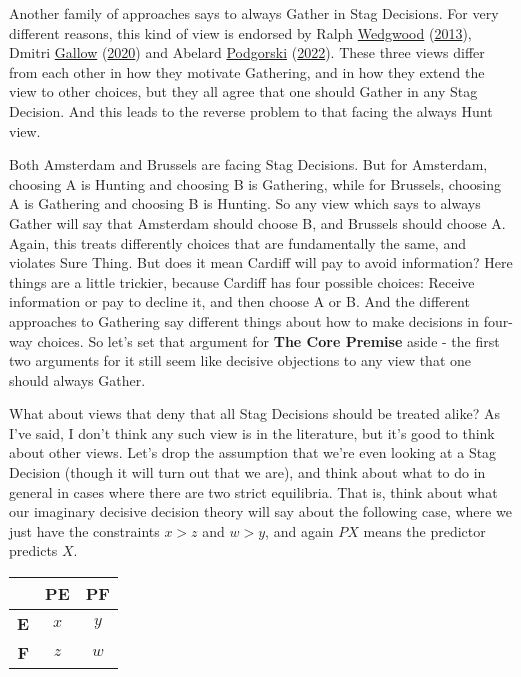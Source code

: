 \documentclass[
  12pt,
]{article}
\begin{document}
Another family of approaches says to always Gather in Stag Decisions.
For very different reasons, this kind of view is endorsed by Ralph
\protect\hyperlink{ref-Wedgwood2013}{Wedgwood}
(\protect\hyperlink{ref-Wedgwood2013}{2013}), Dmitri
\protect\hyperlink{ref-Gallow2020}{Gallow}
(\protect\hyperlink{ref-Gallow2020}{2020}) and Abelard
\protect\hyperlink{ref-Podgorski2022}{Podgorski}
(\protect\hyperlink{ref-Podgorski2022}{2022}). These three views differ
from each other in how they motivate Gathering, and in how they extend
the view to other choices, but they all agree that one should Gather in
any Stag Decision. And this leads to the reverse problem to that facing
the always Hunt view.

Both Amsterdam and Brussels are facing Stag Decisions. But for
Amsterdam, choosing A is Hunting and choosing B is Gathering, while for
Brussels, choosing A is Gathering and choosing B is Hunting. So any view
which says to always Gather will say that Amsterdam should choose B, and
Brussels should choose A. Again, this treats differently choices that
are fundamentally the same, and violates Sure Thing. But does it mean
Cardiff will pay to avoid information? Here things are a little
trickier, because Cardiff has four possible choices: Receive information
or pay to decline it, and then choose A or B. And the different
approaches to Gathering say different things about how to make decisions
in four-way choices. So let's set that argument for \textbf{The Core
Premise} aside - the first two arguments for it still seem like decisive
objections to any view that one should always Gather.

What about views that deny that all Stag Decisions should be treated
alike? As I've said, I don't think any such view is in the literature,
but it's good to think about other views. Let's drop the assumption that
we're even looking at a Stag Decision (though it will turn out that we
are), and think about what to do in general in cases where there are two
strict equilibria. That is, think about what our imaginary decisive
decision theory will say about the following case, where we just have
the constraints \(x > z\) and \(w > y\), and again \(PX\) means the
predictor predicts \(X\).

\begin{table}[H]
\centering
\begin{tabular}[t]{>{}r|cc}

\textbf{ } & \textbf{PE} & \textbf{PF}\\
\midrule
\textbf{E} & $x$ & $y$\\
\textbf{F} & $z$ & $w$\\

\end{tabular}
\end{table}
\end{document}

